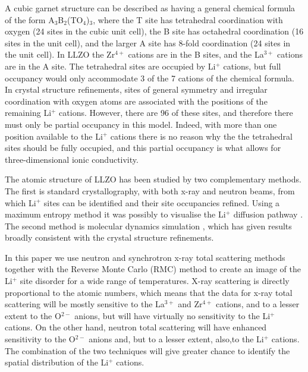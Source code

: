 \documentclass[twoside,twocolumn,9pt]{article}
\begin{document}
A cubic garnet structure can be described \cite{Cussen:2011dg} as having a general chemical formula of the form A$_3$B$_2$(TO$_4$)$_3$, where the T site has tetrahedral coordination with oxygen (24 sites in the cubic unit cell), the B site has octahedral coordination (16 sites in the unit cell), and the larger A site has 8-fold coordination (24 sites in the unit cell). In LLZO the Zr$^{4+}$ cations are in the B sites, and the La$^{3+}$ cations are in the A site. The tetrahedral sites are occupied by Li$^+$ cations, but full occupancy would only accommodate 3 of the 7 cations of the chemical formula. In crystal structure refinements, sites of general symmetry and irregular coordination with oxygen atoms are associated with the positions of the remaining Li$^+$ cations. However, there are 96 of these sites, and therefore there must only be partial occupancy in this model. Indeed, with more than one position available to the Li$^+$ cations there is no reason why the the tetrahedral sites should be fully occupied, and this partial occupancy is what allows for three-dimensional ionic conductivity.

The atomic structure of LLZO has been studied by two complementary methods. The first is standard crystallography, with both x-ray \cite{Awaka:2009jv,Buschmann:2011jo,Geiger:2011cg, Awaka:2011il, DanielRettenwander:2016ei,Wagner:2016bh,Kataoka:2019go} and neutron \cite{Awaka:2009jv,Buschmann:2011jo,Xie:2011gv,Han:2012is,Li:2012fz,DanielRettenwander:2016ei,Wang:2014ic} beams, from which Li$^+$ sites can be identified and their site occupancies refined. Using a maximum entropy method it was possibly to visualise the Li$^+$ diffusion pathway \cite{Han:2012is}.
The second method is molecular dynamics simulation \cite{Wang:2014ic,Klenk:2015ey}, which has given results broadly consistent with the crystal structure refinements.

In this paper we use neutron and synchrotron x-ray total scattering methods together with the Reverse Monte Carlo (RMC) method to create an image of the Li$^+$ site disorder for a wide range of temperatures. X-ray scattering is directly proportional to the atomic numbers, which means that the data for  x-ray total scattering will be mostly sensitive to the La$^{3+}$ and Zr$^{4+}$ cations, and to a lesser extent to the O$^{2-}$ anions, but will have virtually no sensitivity to the Li$^+$ cations. On the other hand, neutron total scattering will have enhanced sensitivity to the O$^{2-}$ anions and, but to a lesser extent, also,to the Li$^+$ cations. The combination of the two techniques will give greater chance to identify the spatial distribution of the  Li$^+$ cations.
\end{document}
